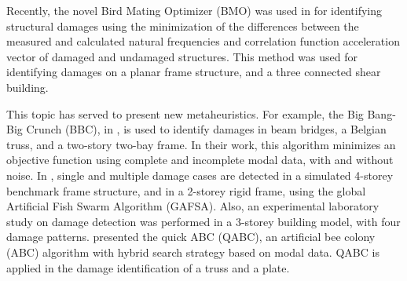 Recently, the novel Bird Mating Optimizer (BMO) was used in  for identifying structural damages using the minimization of the differences between the measured and calculated natural frequencies and correlation function acceleration vector of damaged and undamaged structures. This method was used for identifying damages on a planar frame structure, and a three connected shear building.

This topic has served to present new metaheuristics. For example, the Big Bang-Big Crunch (BBC), in , is used to identify damages in beam bridges, a Belgian truss, and a two-story two-bay frame. In their work, this algorithm minimizes an objective function using complete and incomplete modal data, with and without noise. In , single and multiple damage cases are detected in a simulated 4-storey benchmark frame structure, and in a 2-storey rigid frame, using the global Artificial Fish Swarm Algorithm (GAFSA). Also, an experimental laboratory study on damage detection was performed in a 3-storey building model, with four damage patterns.  presented the quick ABC (QABC), an artificial bee colony (ABC) algorithm with hybrid search strategy based on modal data. QABC is applied in the damage identification of a truss and a plate.

